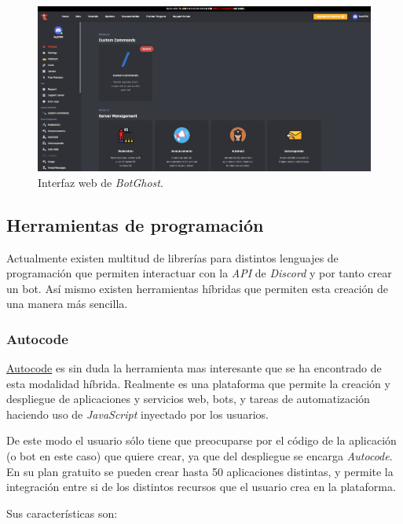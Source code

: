 \begin{figure}[H]
	\centering
	\includegraphics[width=1\textwidth]{img/botghost.png}
	\caption{Interfaz web de \textit{BotGhost}.}
\end{figure}

\subsection{Herramientas de programación}

Actualmente existen multitud de librerías para distintos lenguajes de programación que permiten interactuar con la \textit{API} de \textit{Discord} y por tanto crear un bot. Así mismo existen herramientas híbridas que permiten esta creación de una manera más sencilla.

\subsubsection{Autocode}

\href{https://autocode.com/}{Autocode} es sin duda la herramienta mas interesante que se ha encontrado de esta modalidad híbrida. Realmente es una plataforma que permite la creación y despliegue de aplicaciones y servicios web, bots, y tareas de automatización haciendo uso de \textit{JavaScript} inyectado por los usuarios.

De este modo el usuario sólo tiene que preocuparse por el código de la aplicación (o bot en este caso) que quiere crear, ya que del despliegue se encarga \textit{Autocode}. En su plan gratuito se pueden crear hasta 50 aplicaciones distintas, y permite la integración entre si de los distintos recursos que el usuario crea en la plataforma.

Sus características son:

